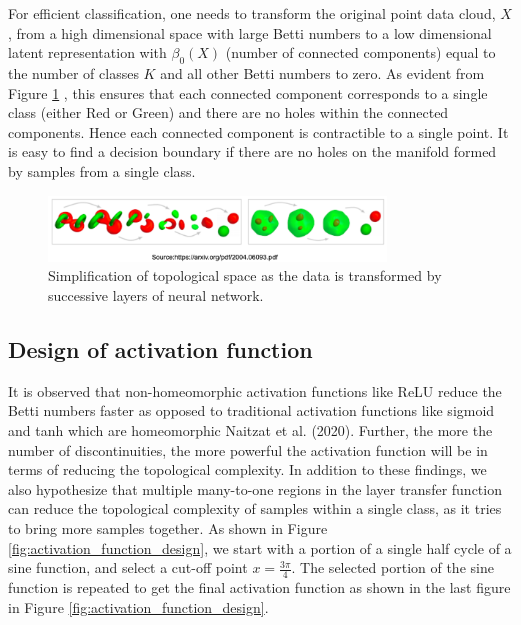 \documentclass[wcp]{jmlr}
\begin{document}
For efficient classification, one needs to transform the original point data cloud, $X$,  from a high dimensional space with large Betti numbers to a low dimensional latent representation with  $\beta_0(X)$ (number of connected components) equal to the number of classes $K$ and all other Betti numbers to zero. As evident from Figure \ref{fig:topological_simplication_layer_by_layer} , this ensures that each connected component  corresponds to a single class (either Red or Green) and there are no holes within the connected components. Hence  each connected component is contractible  to a single point. It is easy to find a decision boundary if there are no holes on the manifold formed by samples from a  single class.

\begin{figure}[htp]
\begin{center}
\includegraphics[width=0.8\textwidth]{images/topological_simplication_layer_by_layer.png}
\caption{Simplification of topological space as the data is transformed by successive layers of neural network.
}\label{fig:topological_simplication_layer_by_layer}
\end{center}
\end{figure}

\subsection{Design of activation function} \label{sec:design_of_activation_function}
It is observed that non-homeomorphic activation functions like ReLU reduce the Betti numbers faster as opposed to traditional  activation functions like sigmoid and tanh which are  homeomorphic Naitzat et al. (2020). Further, the more the number of discontinuities, the more powerful the activation function will be in terms of reducing the topological complexity. In addition to these findings, we also hypothesize that multiple many-to-one regions in the layer transfer function can reduce the topological complexity  of samples within a single class, as it tries to bring more samples together. As shown in Figure \ref{fig:activation_function_design}, we start with  a portion of a single half cycle of a sine function, and select a cut-off point $x=\frac{3\pi}{4}$. The selected portion of the sine function is repeated to get the final activation function as shown in the last figure in Figure \ref{fig:activation_function_design}.
\end{document}
